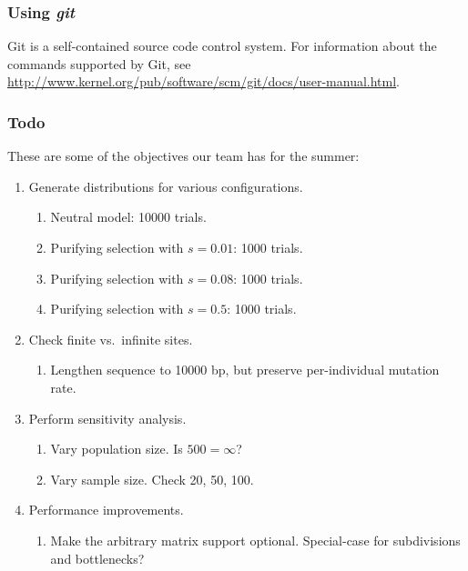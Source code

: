 \documentclass{article}
\begin{document}
      \subsubsection{Using {\em git}}
        \label{sec:git}

        Git is a self-contained source code control system. For information
        about the commands supported by Git, see
        \url{http://www.kernel.org/pub/software/scm/git/docs/user-manual.html}.

      \subsubsection{Todo}
        \label{sec:todo}

        These are some of the objectives our team has for the summer:

        \begin{enumerate}
          \item Generate distributions for various configurations.
            \begin{enumerate}
              \item Neutral model: 10000 trials.
              \item Purifying selection with $s=0.01$: 1000 trials.
              \item Purifying selection with $s=0.08$: 1000 trials.
              \item Purifying selection with $s=0.5$: 1000 trials.
            \end{enumerate}

          \item Check finite vs.\ infinite sites.
            \begin{enumerate}
              \item Lengthen sequence to 10000 bp, but preserve per-individual
              mutation rate.
            \end{enumerate}

          \item Perform sensitivity analysis.
            \begin{enumerate}
              \item Vary population size. Is $500 = \infty$?
              \item Vary sample size. Check 20, 50, 100.
            \end{enumerate}

	  \item Performance improvements.
	    \begin{enumerate}
	      \item Make the arbitrary matrix support optional. Special-case for
	      subdivisions and bottlenecks?
	    \end{enumerate}
        \end{enumerate}
\end{document}
